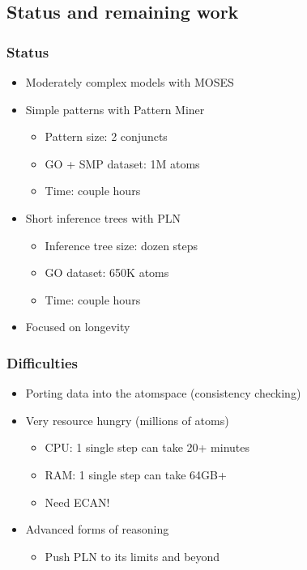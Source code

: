 \documentclass[aspectratio=169]{beamer}
\begin{document}
\subsection{Status and remaining work}

\begin{frame}
  \frametitle{Status}

  \begin{itemize}
  \item Moderately complex models with MOSES
  \item Simple patterns with Pattern Miner
    \begin{itemize}
    \item Pattern size: 2 conjuncts
    \item GO + SMP dataset: 1M atoms
    \item Time: couple hours
    \end{itemize}
  \item Short inference trees with PLN
    \begin{itemize}
    \item Inference tree size: dozen steps
    \item GO dataset: 650K atoms
    \item Time: couple hours
    \end{itemize}
  \item Focused on longevity
  \end{itemize}
\end{frame}

\begin{frame}
  \frametitle{Difficulties}

  \begin{itemize}
  \item Porting data into the atomspace (consistency checking)
  \item Very resource hungry (millions of atoms)\\
    \begin{itemize}
    \item CPU: 1 single step can take 20+ minutes
    \item RAM: 1 single step can take 64GB+
    \item Need ECAN!
    \end{itemize}
  \item Advanced forms of reasoning\\
    \begin{itemize}
    \item Push PLN to its limits and beyond
    \end{itemize}
  \end{itemize}
\end{frame}
\end{document}
